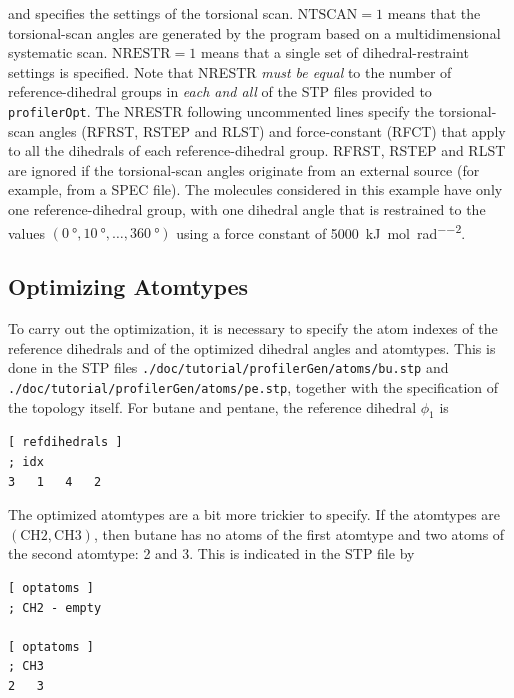\documentclass[10pt,a4paper,openany]{memoir}
\numberwithin{equation}{section}
\newcommand{\profileropt}[0]{\texttt{profilerOpt}}
\newcommand{\varset}[2]{$\text{#1}=#2$}
\begin{document}
\noindent and specifies the settings of the torsional scan.
\varset{NTSCAN}{1} means that the torsional-scan angles are generated
by the program based on a multidimensional systematic scan.
\varset{NRESTR}{1} means that a single set of dihedral-restraint
settings is specified.  Note that NRESTR \textit{must be equal} to the
number of reference-dihedral groups in \textit{each and all} of the
STP files provided to \profileropt{}. The NRESTR following uncommented
lines specify the torsional-scan angles (RFRST, RSTEP and RLST) and
force-constant (RFCT) that apply to all the dihedrals of each
reference-dihedral group.  RFRST, RSTEP and RLST are ignored if the
torsional-scan angles originate from an external source (for example,
from a SPEC file).  The molecules considered in this example have only
one reference-dihedral group, with one dihedral angle that is
restrained to the values
$(\SI{0}{\degree},\SI{10}{\degree},\ldots,\SI{360}{\degree})$ using a
force constant of \SI{5000}{\kJ\per\mole\per\radian\squared}.

\subsection{Optimizing Atomtypes}
\label{sec:tutorial-profileropt-atoms}

To carry out the optimization, it is necessary to specify the atom
indexes of the reference dihedrals and of the optimized dihedral
angles and atomtypes.
%
This is done in the STP files
\texttt{./doc/tutorial/profilerGen/atoms/bu.stp} and
\texttt{./doc/tutorial/profilerGen/atoms/pe.stp}, together with the
specification of the topology itself.
%
For butane and pentane, the reference dihedral $\phi_1$ is

\begin{lstlisting}[language=gromacs]
[ refdihedrals ]
; idx
3   1   4   2
\end{lstlisting}\vspace{2ex}\par

The optimized atomtypes are a bit more trickier to specify.
If the atomtypes are $(\text{CH2}, \text{CH3})$, then butane has no atoms
of the first atomtype and two atoms of the second atomtype: 2 and 3.
This is indicated in the STP file by

\begin{lstlisting}[language=gromacs]
[ optatoms ]
; CH2 - empty

[ optatoms ]
; CH3
2   3
\end{lstlisting}\vspace{2ex}\par
\end{document}
